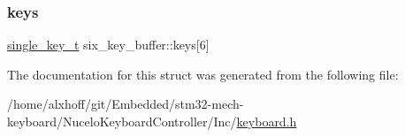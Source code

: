 \subsubsection{\texorpdfstring{keys}{keys}}
{\footnotesize\ttfamily \hyperlink{keyboard_8h_aa504c5d09bf7cea600b72b6003a8772c}{single\+\_\+key\+\_\+t} six\+\_\+key\+\_\+buffer\+::keys\mbox{[}6\mbox{]}}



The documentation for this struct was generated from the following file\+:\begin{DoxyCompactItemize}
\item 
/home/alxhoff/git/\+Embedded/stm32-\/mech-\/keyboard/\+Nucelo\+Keyboard\+Controller/\+Inc/\hyperlink{keyboard_8h}{keyboard.\+h}\end{DoxyCompactItemize}
